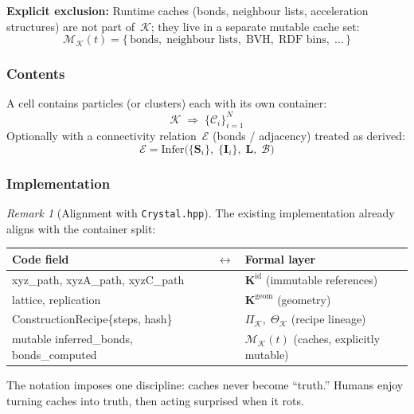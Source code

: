 \documentclass[11pt, a4paper, oneside]{article}
\theoremstyle{definition}
\theoremstyle{remark}
\newtheorem{remark}[postulate]{Remark}
\newcommand{\boldI}{\mathbf{I}}
\newcommand{\boldK}{\mathbf{K}}
\newcommand{\boldL}{\mathbf{L}}
\newcommand{\boldS}{\mathbf{S}}
\begin{document}
\bigskip\noindent
\textbf{Explicit exclusion:}
Runtime caches (bonds, neighbour lists, acceleration structures)
are not part of~$\mathcal{K}$; they live in a separate mutable
cache set:
%
\begin{equation}
  \mathcal{M}_{\mathcal{K}}(t) =
  \{\,\text{bonds},\;
     \text{neighbour lists},\;
     \text{BVH},\;
     \text{RDF bins},\;
     \ldots\,\}
  \label{eq:cell-cache}
\end{equation}

\subsubsection{Contents}
\label{sec:cell-content}

A cell contains particles (or clusters) each with its own container:
\[
  \mathcal{K} \;\Rightarrow\;
  \{\mathcal{C}_i\}_{i=1}^{N}
\]
Optionally with a connectivity relation~$\mathcal{E}$ (bonds /
adjacency) treated as derived:
\begin{equation}
  \mathcal{E} = \mathrm{Infer}\!\bigl(
    \{\boldS_i\},\;
    \{\boldI_i\},\;
    \boldL,\;
    \mathcal{B}
  \bigr)
  \label{eq:connectivity}
\end{equation}

\subsubsection{Implementation}
\label{sec:cell-comparison}

\begin{remark}[Alignment with \texttt{Crystal.hpp}]
The existing implementation already aligns with the container split:
%
\begin{center}
\renewcommand{\arraystretch}{1.3}
\begin{tabularx}{\linewidth}{>{\ttfamily}l c X}
  \toprule
  \textnormal{Code field} & $\longleftrightarrow$ & Formal layer \\
  \midrule
  xyz\_path, xyzA\_path, xyzC\_path
    & & $\boldK^{\mathrm{id}}$ (immutable references) \\
  lattice, replication
    & & $\boldK^{\mathrm{geom}}$ (geometry) \\
  ConstructionRecipe\{steps, hash\}
    & & $\Pi_{\mathcal{K}},\;\Theta_{\mathcal{K}}$ (recipe lineage) \\
  mutable inferred\_bonds, bonds\_computed
    & & $\mathcal{M}_{\mathcal{K}}(t)$ (caches, explicitly mutable) \\
  \bottomrule
\end{tabularx}
\end{center}
%
The notation imposes one discipline: caches never become ``truth.''
Humans enjoy turning caches into truth, then acting surprised when
it rots.
\end{remark}
\end{document}
